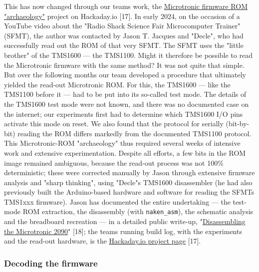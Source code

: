 \documentclass[
  11pt,
  letterpaper,
]{article}
\begin{document}
This has now changed through our team\textquotesingle s work, the
\href{https://hackaday.io/project/197415-microtronic-firmware-rom-archaeology}{Microtronic
firmware ROM "archaeology"} project on Hackaday.io {[}17{]}. In early
2024, on the occasion of a YouTube video about the "Radio Shack Science
Fair Microcomputer Trainer" (SFMT), the author was contacted by Jason T.
Jacques and "Decle", who had successfully read out the ROM of that very
SFMT. The SFMT uses the "little brother" of the TMS1600 --- the TMS1100.
Might it therefore be possible to read the Microtronic firmware with the
same method? It was not quite that simple. But over the following months
our team developed a procedure that ultimately yielded the read-out
Microtronic ROM. For this, the TMS1600 --- like the TMS1100 before it
--- had to be put into its so-called test mode. The details of the
TMS1600 test mode were not known, and there was no documented case on
the internet; our experiments first had to determine which TMS1600 I/O
pins activate this mode on reset. We also found that the protocol for
serially (bit-by-bit) reading the ROM differs markedly from the
documented TMS1100 protocol. This Microtronic-ROM "archaeology" thus
required several weeks of intensive work and extensive experimentation.
Despite all efforts, a few bits in the ROM image remained ambiguous,
because the read-out process was not 100\% deterministic; these were
corrected manually by Jason through extensive firmware analysis and
"sharp thinking", using "Decle"\textquotesingle s TMS1600 disassembler
(he had also previously built the Arduino-based hardware and software
for reading the SFMT\textquotesingle s TMS1xxx firmware). Jason has
documented the entire undertaking --- the test-mode ROM extraction, the
disassembly (with \texttt{naken\_asm}), the schematic analysis and the
breadboard recreation --- in a detailed public write-up,
"\href{https://jsonj.co.uk/project/microtronic/}{Disassembling the
Microtronic 2090}" {[}18{]}; the team\textquotesingle s running build
log, with the experiments and the read-out hardware, is the
\href{https://hackaday.io/project/197415-microtronic-firmware-rom-archaeology}{Hackaday.io
project page} {[}17{]}.

\subsubsection{Decoding the firmware}\label{decoding-the-firmware}
\end{document}
